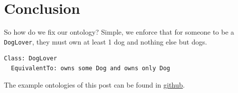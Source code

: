 \documentclass{amsart}
\begin{document}
  \section{Conclusion} 
So how do we fix our ontology? Simple, we enforce that for someone to be a \texttt{DogLover}, they must own at least 1 dog and nothing else but dogs.  
\begin{small}
\begin{verbatim} 
Class: DogLover
  EquivalentTo: owns some Dog and owns only Dog
\end{verbatim}
\end{small}   

The example ontologies of this post can be found in \href{https://github.com/henrietteharmse/henrietteharmse/tree/master/blog/tutorial/ontologies/docs/Understanding\%20OWL\%20Existential\%20Property\%20Restrictions}{github}.

  
  
 
\end{document}
